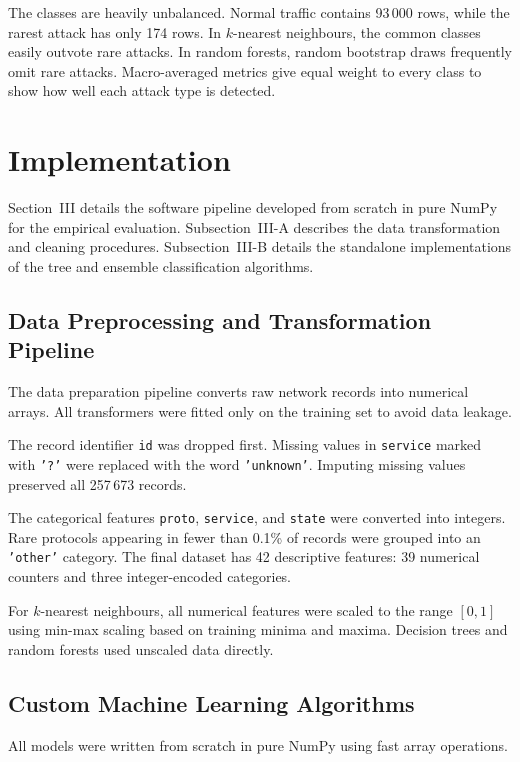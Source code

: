 \documentclass[conference,10pt]{IEEEtran}
\begin{document}
The classes are heavily unbalanced. Normal traffic contains 93\,000 rows, while the rarest attack has only 174 rows. In $k$-nearest neighbours, the common classes easily outvote rare attacks. In random forests, random bootstrap draws frequently omit rare attacks. Macro-averaged metrics give equal weight to every class to show how well each attack type is detected.

\section{Implementation}

Section~III details the software pipeline developed from scratch in pure NumPy for the empirical evaluation. Subsection~III-A describes the data transformation and cleaning procedures. Subsection~III-B details the standalone implementations of the tree and ensemble classification algorithms.

\subsection{Data Preprocessing and Transformation Pipeline}

The data preparation pipeline converts raw network records into numerical arrays. All transformers were fitted only on the training set to avoid data leakage.

The record identifier \texttt{id} was dropped first. Missing values in \texttt{service} marked with \texttt{'?'} were replaced with the word \texttt{'unknown'}. Imputing missing values preserved all 257\,673 records.

The categorical features \texttt{proto}, \texttt{service}, and \texttt{state} were converted into integers. Rare protocols appearing in fewer than 0.1\% of records were grouped into an \texttt{'other'} category. The final dataset has 42 descriptive features: 39 numerical counters and three integer-encoded categories.

For $k$-nearest neighbours, all numerical features were scaled to the range $[0, 1]$ using min-max scaling based on training minima and maxima. Decision trees and random forests used unscaled data directly.

\subsection{Custom Machine Learning Algorithms}

All models were written from scratch in pure NumPy using fast array operations.
\end{document}
